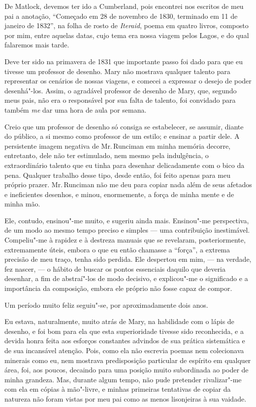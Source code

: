 De Matlock, devemos ter ido a Cumberland, pois encontrei nos escritos de
meu pai a anotação, ``Começado em 28 de novembro de 1830, terminado em
11 de janeiro de 1832'', na folha de rosto de \textit{Iteraid}, poema
em quatro livros, composto por mim, entre aquelas datas, cujo tema era
nossa viagem pelos Lagos, e do qual falaremos mais tarde.

Deve ter sido na primavera de 1831 que importante passo foi dado
para que eu tivesse um professor de desenho. Mary não mostrava qualquer
talento para representar os cenários de nossas viagens, e comecei a
expressar o desejo de poder desenhá"-los. Assim, o agradável professor de
desenho de Mary, que, segundo meus pais, não era o responsável por sua
falta de talento, foi convidado para também \textit{me} dar uma hora de
aula por semana.

Creio que um professor de desenho só consiga se estabelecer, se assumir,
diante do público, a si mesmo como professor de um estilo; e ensinar a
partir dele. A persistente imagem negativa de Mr.\,Runciman em minha \label{84}
memória decorre, entretanto, dele não ter estimulado, nem mesmo pela
indulgência, o extraordinário talento que eu tinha para desenhar
delicadamente com o bico da pena. Qualquer trabalho desse tipo, desde
então, foi feito apenas para meu próprio prazer. Mr.\,Runciman não me deu
para copiar nada além de seus afetados e ineficientes desenhos, e minou,
enormemente, a força de minha mente e de minha mão.

Ele, contudo, ensinou"-me muito, e sugeriu ainda mais. Ensinou"-me
perspectiva, de um modo ao mesmo tempo preciso e simples --- uma
contribuição inestimável. Compeliu"-me à rapidez e à destreza manuais que
se revelaram, posteriormente, extremamente úteis, embora o que eu então
chamasse a ``força'', a extrema precisão de meu traço, tenha sido
perdida. Ele despertou em mim, --- na verdade, fez nascer, --- o hábito de
buscar os pontos essenciais daquilo que deveria desenhar, a fim de
abstraí"-los de modo decisivo, e explicou"-me o significado e a
importância da composição, embora ele próprio não fosse capaz de compor.

Um período muito feliz seguiu"-se, por aproximadamente dois anos.

Eu estava, naturalmente, muito atrás de Mary, na habilidade com o lápis
de desenho, e foi bom para ela que esta superioridade tivesse sido
reconhecida, e a devida honra feita aos esforços constantes advindos de
sua prática sistemática e de sua incansável atenção. Pois, como ela não
escrevia poemas nem colecionava minerais como eu, nem mostrava
predisposição particular de espírito em qualquer área, foi, aos poucos,
decaindo para uma posição muito subordinada ao poder de minha grandeza.
Mas, durante algum tempo, não pude pretender rivalizar"-me com ela em
cópias à mão"-livre, e minhas primeiras tentativas de copiar da natureza
não foram vistas por meu pai como as menos lisonjeiras à sua vaidade.

